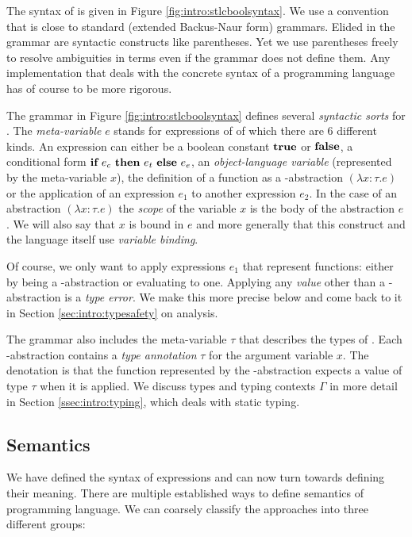 {The syntax of \stlcbool is given in Figure \ref{fig:intro:stlcboolsyntax}. We
use a convention that is close to standard (extended Backus-Naur form)
grammars. Elided in the grammar are syntactic constructs like parentheses. Yet
we use parentheses freely to resolve ambiguities in terms even if the grammar
does not define them. Any implementation that deals with the concrete syntax of
a programming language has of course to be more rigorous.

The grammar in Figure \ref{fig:intro:stlcboolsyntax} defines several
\emph{syntactic sorts} for \stlcbool. The \emph{meta-variable} $e$ stands for
expressions of \stlcbool of which there are 6 different kinds. An expression can
either be a boolean constant $\textbf{true}$ or $\textbf{false}$, a conditional form
$\textbf{if}~{e_c}~\textbf{then}~{e_t}~\textbf{else}~{e_e}$, an \emph{object-language variable} (represented by the
meta-variable $x$), the definition of a function as a \textlambda-abstraction
$(\lambda x:\tau.e)$ or the application of an expression $e_1$ to another
expression $e_2$. In the case of an abstraction $(\lambda x:\tau.e)$ the
\emph{scope} of the variable $x$ is the body of the abstraction $e$. We will
also say that $x$ is bound in $e$ and more generally that this construct and the
\stlcbool language itself use \emph{variable binding}.

Of course, we only want to apply expressions $e_1$ that represent functions:
either by being a \textlambda-abstraction or evaluating to one. Applying any
\emph{value} other than a \textlambda-abstraction is a \emph{type error}. We
make this more precise below and come back to it in Section
\ref{sec:intro:typesafety} on analysis.

The grammar also includes the meta-variable $\tau$ that describes the types of
\stlcbool. Each \textlambda-abstraction contains a \emph{type annotation} $\tau$
for the argument variable $x$. The denotation is that the function represented
by the \textlambda-abstraction expects a value of type $\tau$ when it is
applied. We discuss types and typing contexts $\Gamma$ in more detail in Section
\ref{ssec:intro:typing}, which deals with static typing.


\subsection{Semantics}\label{ssec:intro:semantics}

We have defined the syntax of \stlcbool expressions and can now turn towards
defining their meaning. There are multiple established ways to define semantics
of programming language. We can coarsely classify the approaches into three
different groups:

}
